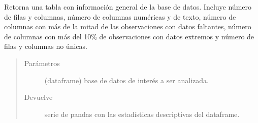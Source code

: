 \documentclass[letterpaper,10pt,openany,spanish]{sphinxmanual}
\begin{document}

\begin{fulllineitems}
\label{\detokenize{datos:datos.correlacion}}
\end{fulllineitems}


\begin{fulllineitems}
\label{\detokenize{datos:datos.data_summary}}
Retorna una tabla con información general de la base de datos. Incluye número de filas y columnas, número de columnas numéricas y de texto, número de columnas con más de la mitad de las observaciones con datos faltantes, número de columnas con más del 10\% de observaciones con datos extremos y número de filas y columnas no únicas.
\begin{quote}\begin{description}
\item[{Parámetros}] \leavevmode
{} \textendash{} (dataframe) base de datos de interés a ser analizada.

\item[{Devuelve}] \leavevmode
serie de pandas con las estadísticas descriptivas del dataframe.

\end{description}\end{quote}

\end{fulllineitems}

\end{document}
